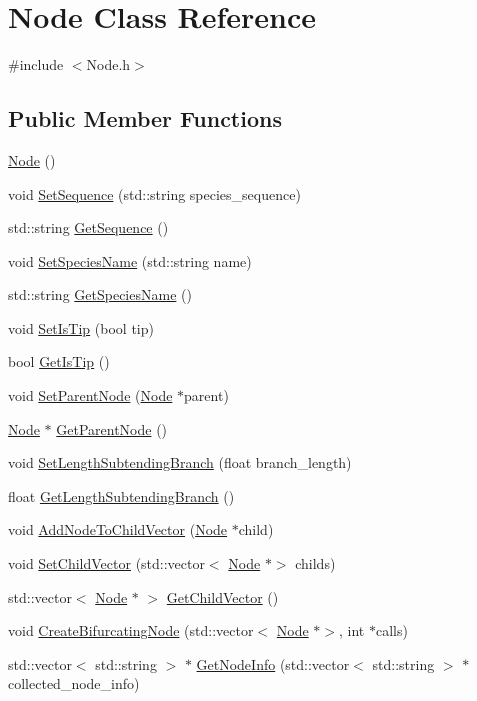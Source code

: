 \hypertarget{classNode}{}\section{Node Class Reference}
\label{classNode}


{\ttfamily \#include $<$Node.\+h$>$}

\subsection*{Public Member Functions}
\begin{DoxyCompactItemize}
\item 
\hyperlink{classNode_ad7a34779cad45d997bfd6d3d8043c75f}{Node} ()
\item 
void \hyperlink{classNode_af92559fbef1938022d59b2902703afaa}{Set\+Sequence} (std\+::string species\+\_\+sequence)
\item 
std\+::string \hyperlink{classNode_a69f309f68de4f08e950a15ae79571ec0}{Get\+Sequence} ()
\item 
void \hyperlink{classNode_af4ba012237c10c42f2118e629633b844}{Set\+Species\+Name} (std\+::string name)
\item 
std\+::string \hyperlink{classNode_a9787fabf589f2b0764482b41091f775b}{Get\+Species\+Name} ()
\item 
void \hyperlink{classNode_a89bff92e3930d521439395ccf332418f}{Set\+Is\+Tip} (bool tip)
\item 
bool \hyperlink{classNode_ac2902fa01a9ebbeb692fe16d75bd6be2}{Get\+Is\+Tip} ()
\item 
void \hyperlink{classNode_acb22b8f28ca70e1316a6bafc375ee352}{Set\+Parent\+Node} (\hyperlink{classNode}{Node} $\ast$parent)
\item 
\hyperlink{classNode}{Node} $\ast$ \hyperlink{classNode_a032d93c17743138203c77c721edfdae6}{Get\+Parent\+Node} ()
\item 
void \hyperlink{classNode_a9d7592d6bf479825eb411a244f4d7ad2}{Set\+Length\+Subtending\+Branch} (float branch\+\_\+length)
\item 
float \hyperlink{classNode_a7e55b2011625f394b8b08310b8cf45dc}{Get\+Length\+Subtending\+Branch} ()
\item 
void \hyperlink{classNode_aef73af92aa3046218f83ed67a7996188}{Add\+Node\+To\+Child\+Vector} (\hyperlink{classNode}{Node} $\ast$child)
\item 
void \hyperlink{classNode_a7480924f7879b04fe8c787f42ee888fe}{Set\+Child\+Vector} (std\+::vector$<$ \hyperlink{classNode}{Node} $\ast$$>$ childs)
\item 
std\+::vector$<$ \hyperlink{classNode}{Node} $\ast$ $>$ \hyperlink{classNode_a9b9823315fd95dcd24aac97316de2859}{Get\+Child\+Vector} ()
\item 
void \hyperlink{classNode_a73e4640e16847b3c1b655930c193d03b}{Create\+Bifurcating\+Node} (std\+::vector$<$ \hyperlink{classNode}{Node} $\ast$$>$, int $\ast$calls)
\item 
std\+::vector$<$ std\+::string $>$ $\ast$ \hyperlink{classNode_aeb57ef43b22fa37c2855ebb07e4e7331}{Get\+Node\+Info} (std\+::vector$<$ std\+::string $>$ $\ast$collected\+\_\+node\+\_\+info)
\end{DoxyCompactItemize}


